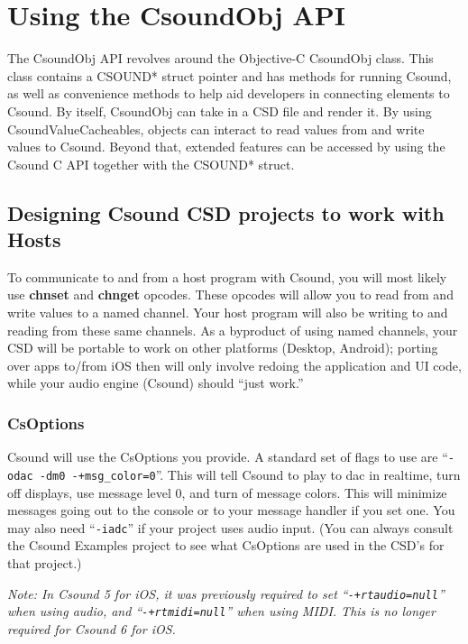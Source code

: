 \documentclass[11pt]{article}
\begin{document}
\section{Using the CsoundObj API}

The CsoundObj API revolves around the Objective-C CsoundObj class. This class contains a CSOUND* struct pointer and has methods for running Csound, as well as convenience methods to help aid developers in connecting elements to Csound. By itself, CsoundObj can take in a CSD file and render it.  By using CsoundValueCacheables, objects can interact to read values from and write values to Csound.  Beyond that, extended features can be accessed by using the Csound C API together with the CSOUND* struct.

\subsection{Designing Csound CSD projects to work with Hosts}

To communicate to and from a host program with Csound, you will most likely use \textbf{chnset} and \textbf{chnget} opcodes. These opcodes will allow you to read from and write values to a named channel.  Your host program will also be writing to and reading from these same channels.  As a byproduct of using named channels, your CSD will be portable to work on other platforms (Desktop, Android); porting over apps to/from iOS then will only involve redoing the application and UI code, while your audio engine (Csound) should ``just work.'' 

\subsubsection{CsOptions}

Csound will use the CsOptions you provide.  A standard set of flags to use are ``{\tt -odac -dm0 -+msg\_color=0}''. This will tell Csound to play to dac in realtime, turn off displays, use message level 0, and turn of message colors.  This will minimize messages going out to the console or to your message handler if you set one.  You may also need ``{\tt -iadc}'' if your project uses audio input. (You can always consult the Csound Examples project to see what CsOptions are used in the CSD's for that project.)  

\emph{Note: In Csound 5 for iOS, it was previously required to set \linebreak ``{\tt -+rtaudio=null}'' when using audio, and ``{\tt -+rtmidi=null}'' when using MIDI. This is no longer required for Csound 6 for iOS.}
\end{document}
